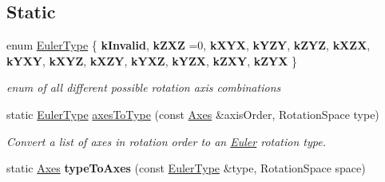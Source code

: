 \subsection*{Static}
\begin{DoxyCompactItemize}
\item 
enum \mbox{\hyperlink{classrev_1_1_euler_angles_a27302602f4b1e12892749e201df3d52d}{Euler\+Type}} \{ \newline
{\bfseries k\+Invalid}, 
{\bfseries k\+Z\+XZ} =0, 
{\bfseries k\+X\+YX}, 
{\bfseries k\+Y\+ZY}, 
\newline
{\bfseries k\+Z\+YZ}, 
{\bfseries k\+X\+ZX}, 
{\bfseries k\+Y\+XY}, 
{\bfseries k\+X\+YZ}, 
\newline
{\bfseries k\+X\+ZY}, 
{\bfseries k\+Y\+XZ}, 
{\bfseries k\+Y\+ZX}, 
{\bfseries k\+Z\+XY}, 
\newline
{\bfseries k\+Z\+YX}
 \}
\begin{DoxyCompactList}\small\item\em enum of all different possible rotation axis combinations \end{DoxyCompactList}\item 
\mbox{\label{classrev_1_1_euler_angles_ab79e1305b5da71d58ee6d1091c42d4b9}} 
static \mbox{\hyperlink{classrev_1_1_euler_angles_a27302602f4b1e12892749e201df3d52d}{Euler\+Type}} \mbox{\hyperlink{classrev_1_1_euler_angles_ab79e1305b5da71d58ee6d1091c42d4b9}{axes\+To\+Type}} (const \mbox{\hyperlink{classrev_1_1_vector}{Axes}} \&axis\+Order, Rotation\+Space type)
\begin{DoxyCompactList}\small\item\em Convert a list of axes in rotation order to an \mbox{\hyperlink{class_euler}{Euler}} rotation type. \end{DoxyCompactList}\item 
\mbox{\label{classrev_1_1_euler_angles_a40406ac137c07fde18d371a3378cb147}} 
static \mbox{\hyperlink{classrev_1_1_vector}{Axes}} {\bfseries type\+To\+Axes} (const \mbox{\hyperlink{classrev_1_1_euler_angles_a27302602f4b1e12892749e201df3d52d}{Euler\+Type}} \&type, Rotation\+Space space)
\end{DoxyCompactItemize}
